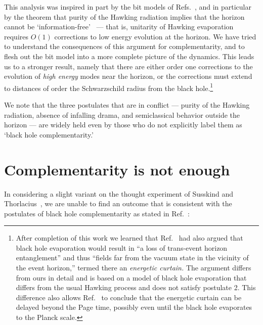 \documentclass[12pt]{article}
\newcommand{\sect}[1]{\section{#1}\setcounter{equation}{0}}
\begin{document}
This analysis was inspired in part by the bit models of Refs.~\cite{Mathur:2009hf, Mathur2, Czech:2011wy, Giddings:2011ks, Avery:2011nb, Mathur:2012zp}, and in particular by the theorem that purity of the Hawking radiation implies that the horizon cannot be `information-free'~\cite{Mathur:2009hf} --- that is, unitarity of Hawking evaporation requires $O(1)$ corrections to low energy evolution at the horizon.  We have tried to understand the consequences of this argument for complementarity, and to flesh out the bit model into a more complete picture of the dynamics.   This leads us to a stronger result, namely that there are either order one corrections to the evolution of {\it high energy} modes near the horizon, or the corrections must extend to distances of order the Schwarzschild radius from the black hole.\footnote
{After completion of this work we learned that Ref.~\cite{Braunstein:2009my}  had also argued that black hole evaporation would result in ``a loss of trans-event horizon entanglement'' and thus ``fields far from the vacuum state in the vicinity of the event horizon,'' termed there an {\it energetic curtain.} The argument differs from ours in detail and is based on a model of black hole evaporation that differs from the usual Hawking process and does not satisfy postulate 2. This difference also allows Ref.~\cite{Braunstein:2009my} to conclude that the energetic curtain can be delayed beyond the Page time, possibly even until the black hole evaporates to the Planck scale.}


We note that the three postulates that are in conflict --- purity of the Hawking radiation, absence of infalling drama, and semiclassical behavior outside the horizon --- are widely held even by those who do not explicitly label them as `black hole complementarity.' 

\sect{Complementarity is not enough}
\label{comp}

In considering a slight variant on the thought experiment of Susskind and Thorlacius~\cite{Susskind:1993mu}, we are unable to find an outcome that is consistent with the postulates of black hole complementarity as stated in  Ref.~\cite{Susskind:1993if}:
\end{document}

